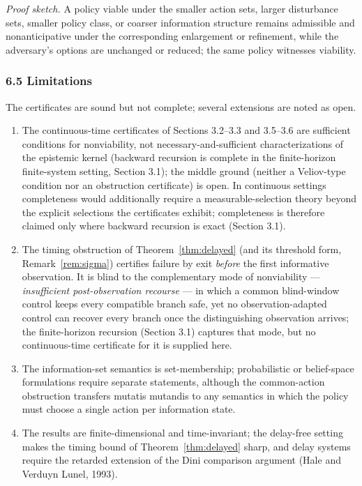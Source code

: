 \documentclass[10pt,twocolumn]{article}
\theoremstyle{definition}
\providecommand{\tightlist}{\setlength{\itemsep}{0pt}\setlength{\parskip}{0pt}}
\begin{document}
\emph{Proof sketch.} A policy viable under the smaller action sets, larger disturbance sets, smaller policy class, or coarser information structure remains admissible and nonanticipative under the corresponding enlargement or refinement, while the adversary's options are unchanged or reduced; the same policy witnesses viability.

\subsubsection{6.5 Limitations}\label{limitations}

The certificates are sound but not complete; several extensions are noted as open.

\begin{enumerate}
\def\labelenumi{(\roman{enumi})}
\tightlist
\item
  The continuous-time certificates of Sections 3.2--3.3 and 3.5--3.6 are sufficient conditions for nonviability, not necessary-and-sufficient characterizations of the epistemic kernel (backward recursion is complete in the finite-horizon finite-system setting, Section 3.1); the middle ground (neither a Veliov-type condition nor an obstruction certificate) is open. In
continuous settings completeness would additionally require a
measurable-selection theory beyond the explicit selections the
certificates exhibit; completeness is therefore claimed only where
backward recursion is exact (Section 3.1).
\item
  The timing obstruction of Theorem~\ref{thm:delayed} (and its threshold form, Remark~\ref{rem:sigma}) certifies failure by exit \emph{before} the first informative observation. It is blind to the complementary mode of nonviability --- \emph{insufficient post-observation recourse} --- in which a common blind-window control keeps every compatible branch safe, yet no observation-adapted control can recover every branch once the distinguishing observation arrives; the finite-horizon recursion (Section 3.1) captures that mode, but no continuous-time certificate for it is supplied here.
\item
  The information-set semantics is set-membership; probabilistic or belief-space formulations require separate statements, although the common-action obstruction transfers mutatis mutandis to any semantics in which the policy must choose a single action per information state.
\item
  The results are finite-dimensional and time-invariant; the delay-free setting makes the timing bound of Theorem~\ref{thm:delayed} sharp, and delay systems require the retarded extension of the Dini comparison argument (Hale and Verduyn Lunel, 1993).

\end{enumerate}
\end{document}
